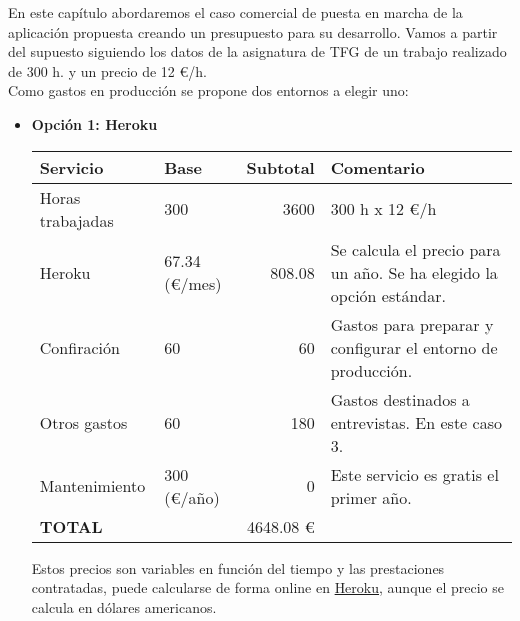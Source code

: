 

En este capítulo abordaremos el caso comercial de puesta en marcha de la aplicación propuesta creando un presupuesto para su desarrollo. Vamos a partir del supuesto siguiendo los datos de la asignatura de TFG de un trabajo realizado de 300 h. y un precio de 12 \euro/h. \\



Como gastos en producción se propone dos entornos a elegir uno:

\begin{itemize}

\item \textbf{Opción 1: Heroku}
\begin{center}
    \begin{tabular}{| l | l | r | p{5cm} |}
    \hline
    Servicio & Base & Subtotal & Comentario \\ \hline
    Horas trabajadas & 300 & 3600 & 300 h x 12 \euro/h \\ \hline
    Heroku & 67.34 (\euro/mes) & 808.08 & Se calcula el precio para un año. Se ha elegido la opción estándar.\\ \hline
    Confiración & 60 & 60 & Gastos para preparar y configurar el entorno de producción. \\ \hline 
    Otros gastos & 60 & 180 & Gastos destinados a entrevistas. En este caso 3. \\ \hline 
    Mantenimiento & 300 (\euro/año) & 0 & Este servicio es gratis el primer año. \\ \hline
    \textbf{TOTAL} &  & 4648.08 \euro &  \\
    \hline
    \end{tabular}
\end{center}

Estos precios son variables en función del tiempo y las prestaciones contratadas, puede calcularse de forma online en \href{https://www.heroku.com/pricing}{Heroku}, aunque el precio se calcula en dólares americanos. 


\end{itemize}
